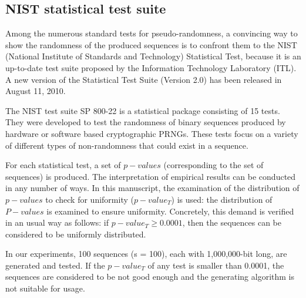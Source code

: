 \subsection{NIST statistical test suite}



Among the numerous standard tests for pseudo-randomness, a convincing way to show the randomness of the produced sequences is to confront them to the NIST (National Institute of Standards and Technology) Statistical Test, because it is an up-to-date test suite proposed by the Information Technology Laboratory (ITL). A new version of the Statistical Test Suite (Version 2.0) has been released in August 11, 2010.


The NIST test suite SP 800-22 is a statistical package consisting of 15 tests. They were developed to test the randomness of binary sequences produced by hardware or software based cryptographic PRNGs. These tests focus on a variety of different types of non-randomness that could exist in a sequence. 


For each statistical test, a set of $p-values$ (corresponding to the set of sequences) is produced. The interpretation of empirical results can be conducted in any number of ways. In this manuscript, the examination of the distribution of $p-values$ to check for uniformity ($p-value_{T}$) is used:
the distribution of $P-values$ is examined to ensure uniformity. 
Concretely, this demand is verified in an usual way as follows: if $p-value_{T} \geqslant 0.0001$, then the sequences can be considered to be uniformly distributed.

In our experiments, 100 sequences (s = 100), each with 1,000,000-bit long, are generated and tested. If the $p-value_{T}$ of any test is smaller than 0.0001, the sequences are considered to be not good enough and the generating algorithm is not suitable for usage.

